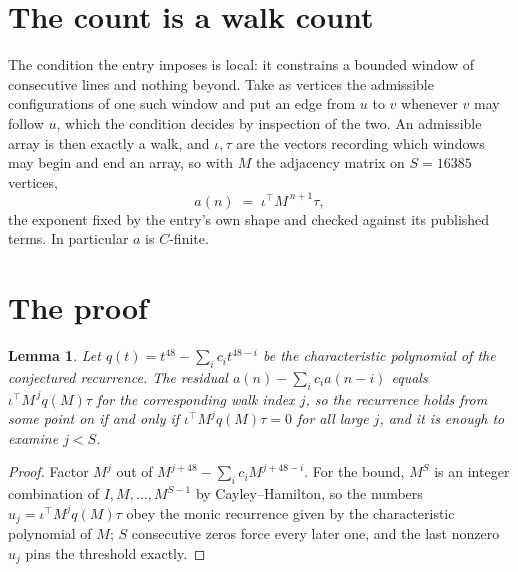 \documentclass[11pt,a4paper]{article}
\theoremstyle{plain}
\newtheorem{lemma}[theorem]{Lemma}
\theoremstyle{definition}
\begin{document}
\section{The count is a walk count}

The condition the entry imposes is local: it constrains a bounded window of consecutive lines and nothing beyond. Take as vertices the admissible configurations of one such window and put an edge from $u$ to $v$ whenever $v$ may follow $u$, which the condition decides by inspection of the two.
An admissible array is then exactly a walk, and $\iota,\tau$ are the vectors recording which windows may begin and end an array, so with $M$ the adjacency matrix on $S=16385$ vertices,
\[
a(n)\;=\;\iota^{\!\top}M^{\,n+1}\tau ,
\]
the exponent fixed by the entry's own shape and checked against its published terms. In
particular $a$ is $C$-finite.

\section{The proof}

\begin{lemma}\label{lem:crit}
Let $q(t)=t^{48}-\sum_i c_it^{48-i}$ be the characteristic polynomial of the
conjectured recurrence. The residual $a(n)-\sum_ic_ia(n-i)$ equals
$\iota^{\!\top}M^{\,j}q(M)\tau$ for the corresponding walk index $j$, so the recurrence
holds from some point on if and only if $\iota^{\!\top}M^{j}q(M)\tau=0$ for all large $j$,
and it is enough to examine $j<S$.
\end{lemma}

\begin{proof}
Factor $M^{j}$ out of $M^{j+48}-\sum_ic_iM^{j+48-i}$. For the bound, $M^{S}$
is an integer combination of $I,M,\dots,M^{S-1}$ by Cayley--Hamilton, so the numbers
$u_j=\iota^{\!\top}M^{j}q(M)\tau$ obey the monic recurrence given by the characteristic
polynomial of $M$; $S$ consecutive zeros force every later one, and the last nonzero $u_j$
pins the threshold exactly.
\end{proof}
\end{document}
